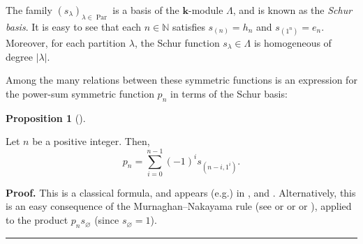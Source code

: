\documentclass[numbers=enddot,12pt,final,onecolumn,notitlepage]{scrartcl}%
\theoremstyle{definition}
\newtheorem{prop}[theo]{Proposition}
\newenvironment{proposition}[1][]
{\begin{prop}[#1]\begin{leftbar}}
{\end{leftbar}\end{prop}}
\newenvironment{proof}[1][Proof]{\noindent\textbf{#1.} }{\ \rule{0.5em}{0.5em}}
\let\sumnonlimits\sum
\renewcommand{\sum}{\sumnonlimits\limits}
\begin{document}
\begin{itemize}
The family $\left(  s_{\lambda}\right)  _{\lambda\in\operatorname*{Par}}$ is a
basis of the $\mathbf{k}$-module $\Lambda$, and is known as the \emph{Schur
basis}. It is easy to see that each $n\in\mathbb{N}$ satisfies $s_{\left(
n\right)  }=h_{n}$ and $s_{\left(  1^{n}\right)  }=e_{n}$. Moreover, for each
partition $\lambda$, the Schur function $s_{\lambda}\in\Lambda$ is homogeneous
of degree $\left\vert \lambda\right\vert $.
\end{itemize}

Among the many relations between these symmetric functions is an expression
for the power-sum symmetric function $p_{n}$ in terms of the Schur basis:

\begin{proposition}
\label{prop.p-as-sum}Let $n$ be a positive integer. Then,%
\[
p_{n}=\sum_{i=0}^{n-1}\left(  -1\right)  ^{i}s_{\left(  n-i,1^{i}\right)  }.
\]

\end{proposition}

\begin{proof}
This is a classical formula, and appears (e.g.) in \cite[Problem 4.21]%
{Egge19}, \cite[Exercise 5.4.12(g)]{GriRei} and \cite[Exercise 2.2]{MenRem15}.
Alternatively, this is an easy consequence of the Murnaghan--Nakayama rule
(see \cite[Theorem 6.3]{MenRem15} or \cite[Theorem 4.4.2]{Sam17} or
\cite[Theorem 7.17.3]{Stanley-EC2} or \cite[(1)]{Wildon15}), applied to the
product $p_{n}s_{\varnothing}$ (since $s_{\varnothing}=1$).
\end{proof}
\end{document}
